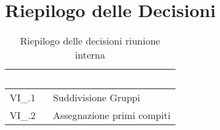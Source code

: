 \section{Riepilogo delle Decisioni}


\begin{table}[!htbp]
\renewcommand{\arraystretch}{1.5}
\begin{tabular}{m{}<{\centering}  m{}<{\centering}}
\rowcolor{darkblue} \textcolor{white}{\textbf{Codice}} & \textcolor{white}{\textbf{Decisione}} \\
\hline
VI\_\D{}.1 & Suddivisione Gruppi\\
\rowcolor{gray!10} VI\_\D{}.2 & Assegnazione primi compiti \\
\end{tabular}
\caption{Riepilogo delle decisioni riunione interna \D{}}
\end{table}